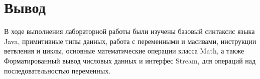 \section{Вывод}
В ходе выполнения лабораторной работы были изучены базовый синтаксис языка Java, примитивные типы данных, работа с переменными и масивами, инструкции ветвления и циклы, основные математические операции класса Math, а также Форматированный вывод числовых данных и интерфес Stream, для операций над последовательностью переменных.